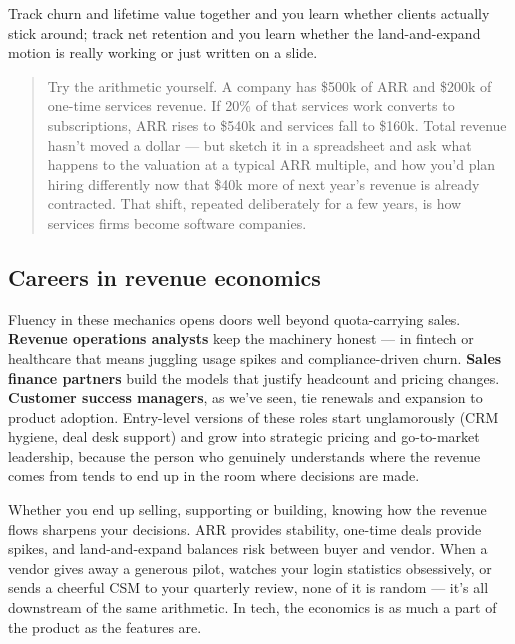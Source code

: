 Track churn and lifetime value together and you learn whether clients actually stick around; track net retention and you learn whether the land-and-expand motion is really working or just written on a slide.



\begin{quote}\small
Try the arithmetic yourself. A company has \$500k of ARR and \$200k of one-time services revenue. If 20\% of that services work converts to subscriptions, ARR rises to \$540k and services fall to \$160k. Total revenue hasn't moved a dollar — but sketch it in a spreadsheet and ask what happens to the valuation at a typical ARR multiple, and how you'd plan hiring differently now that \$40k more of next year's revenue is already contracted. That shift, repeated deliberately for a few years, is how services firms become software companies.
\end{quote}



\subsection{Careers in revenue economics}


Fluency in these mechanics opens doors well beyond quota-carrying sales. \textbf{Revenue operations analysts} keep the machinery honest — in fintech or healthcare that means juggling usage spikes and compliance-driven churn. \textbf{Sales finance partners} build the models that justify headcount and pricing changes. \textbf{Customer success managers}, as we've seen, tie renewals and expansion to product adoption. Entry-level versions of these roles start unglamorously (CRM hygiene, deal desk support) and grow into strategic pricing and go-to-market leadership, because the person who genuinely understands where the revenue comes from tends to end up in the room where decisions are made.


Whether you end up selling, supporting or building, knowing how the revenue flows sharpens your decisions. ARR provides stability, one-time deals provide spikes, and land-and-expand balances risk between buyer and vendor. When a vendor gives away a generous pilot, watches your login statistics obsessively, or sends a cheerful CSM to your quarterly review, none of it is random — it's all downstream of the same arithmetic. In tech, the economics is as much a part of the product as the features are.

